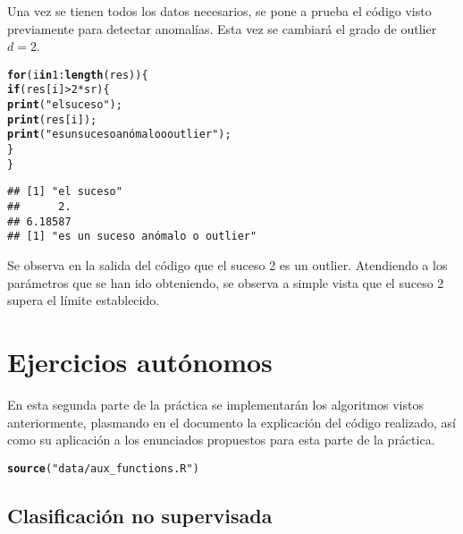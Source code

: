 \documentclass[12pt]{report}\usepackage[]{graphicx}\usepackage[dvipsnames]{xcolor}
\makeatletter
\newcommand{\hlnum}[1]{\textcolor[rgb]{0.686,0.059,0.569}{#1}}%
\newcommand{\hlstr}[1]{\textcolor[rgb]{0.192,0.494,0.8}{#1}}%
\newcommand{\hlopt}[1]{\textcolor[rgb]{0,0,0}{#1}}%
\newcommand{\hlstd}[1]{\textcolor[rgb]{0.345,0.345,0.345}{#1}}%
\newcommand{\hlkwa}[1]{\textcolor[rgb]{0.161,0.373,0.58}{\textbf{#1}}}%
\newcommand{\hlkwd}[1]{\textcolor[rgb]{0.737,0.353,0.396}{\textbf{#1}}}%
\newenvironment{kframe}{%
 \def\at@end@of@kframe{}%
 \ifinner\ifhmode%
  \def\at@end@of@kframe{\end{minipage}}%
  \begin{minipage}{\columnwidth}%
 \fi\fi%
 \def\FrameCommand##1{\hskip\@totalleftmargin \hskip-\fboxsep
 \colorbox{shadecolor}{##1}\hskip-\fboxsep
     \hskip-\linewidth \hskip-\@totalleftmargin \hskip\columnwidth}%
 \MakeFramed {\advance\hsize-\width
   \@totalleftmargin\z@ \linewidth\hsize
   \@setminipage}}%
 {\par\unskip\endMakeFramed%
 \at@end@of@kframe}
\newenvironment{knitrout}{}{} %
\makeatother
\begin{document}
			 Una vez se tienen todos los datos necesarios, se pone a prueba el código visto previamente para detectar anomalías. Esta vez se cambiará el grado de outlier $d = 2$.
			 
\begin{knitrout}
\color{fgcolor}\begin{kframe}
\begin{alltt}
\hlkwa{for} \hlstd{(i} \hlkwa{in} \hlnum{1}\hlopt{:}\hlkwd{length}\hlstd{(res))\{}
        \hlkwa{if}\hlstd{(res[i]}\hlopt{>}\hlnum{2}\hlopt{*}\hlstd{sr)\{}
                \hlkwd{print}\hlstd{(}\hlstr{"el suceso"}\hlstd{);}
                \hlkwd{print}\hlstd{(res[i]);}
                \hlkwd{print}\hlstd{(}\hlstr{"es un suceso anómalo o outlier"}\hlstd{);}
                                 \hlstd{\}}
\hlstd{\}}
\end{alltt}
\begin{verbatim}
## [1] "el suceso"
##      2. 
## 6.18587 
## [1] "es un suceso anómalo o outlier"
\end{verbatim}
\end{kframe}
\end{knitrout}
			 
			 Se observa en la salida del código que el suceso 2 es un outlier. Atendiendo a los parámetros que se han ido obteniendo, se observa a simple vista que el suceso 2 supera el límite establecido. 
	 
	 \chapter{Ejercicios autónomos}
	 
		 En esta segunda parte de la práctica se implementarán los algoritmos vistos anteriormente, plasmando en el documento la explicación del código realizado, así como su aplicación a los enunciados propuestos para esta parte de la práctica.
		 
\begin{knitrout}
\color{fgcolor}\begin{kframe}
\begin{alltt}
\hlkwd{source}\hlstd{(}\hlstr{"data/aux_functions.R"}\hlstd{)}
\end{alltt}
\end{kframe}
\end{knitrout}
		 
		 \section{Clasificación no supervisada}
		 
\end{document}

